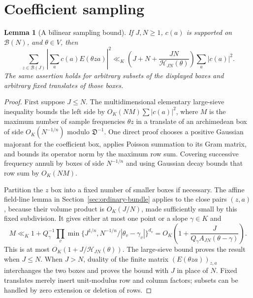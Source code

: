 \documentclass[11pt]{amsart}
\newtheorem{lemma}[theorem]{Lemma}
\theoremstyle{definition}
\numberwithin{equation}{section}
\begin{document}
\section{Coefficient sampling}
\label{sec:coefficient-sampling-common}
\begin{lemma}[A bilinear sampling bound]
\label{lem:g789-bilinear}
If $J,N\ge1$, $c(a)$ is supported on $\mathcal B(N)$, and
$\theta\in V$, then
\[
 \sum_{z\in\mathcal B(J)}
       \left|\sum_a c(a)E(\theta za)\right|^2
 \ll_K\left(J+N+\frac{JN}{\mathcal H_{JN}(\theta)}\right)
                         \sum_a|c(a)|^2.
\]
The same assertion holds for arbitrary subsets of the displayed
boxes and arbitrary fixed translates of those boxes.
\end{lemma}
\begin{proof}
First suppose $J\le N$. The multidimensional elementary large-sieve
inequality bounds the left side by $O_K(NM)\sum|c(a)|^2$, where $M$
is the maximum number of sample frequencies $\theta z$ in a translate
of an archimedean box of side $O_K(N^{-1/n})$ modulo
$\mathfrak D^{-1}$. One direct proof chooses a positive Gaussian
majorant for the coefficient box, applies Poisson summation to its
Gram matrix, and bounds its operator norm by the maximum row sum.
Covering successive frequency annuli by boxes of side $N^{-1/n}$
and using Gaussian decay bounds that row sum by $O_K(NM)$.

Partition the $z$ box into a fixed number of smaller boxes if
necessary. The affine field-line lemma in Section~\ref{sec:ordinary-bundle}
applies to the close pairs $(z,a)$, because their volume product is
$O_K(J/N)$, made sufficiently small by this fixed subdivision.
It gives either at most one point or a slope $\gamma\in K$ and
\[
 M\ll_K1+Q_\gamma^{-1}
       \prod_v\min\{J^{1/n},N^{-1/n}/|\theta_v-\gamma_v|\}^{d_v}
 =O_K\left(1+\frac{J}{Q_\gamma A_{JN}(\theta-\gamma)}\right).
\]
This is at most $O_K(1+J/\mathcal H_{JN}(\theta))$.
The large-sieve bound proves the result when $J\le N$.
When $J>N$, duality of the finite matrix
$(E(\theta za))_{z,a}$ interchanges the two boxes and proves the
bound with $J$ in place of $N$. Fixed translates merely insert
unit-modulus row and column factors; subsets can be handled by
zero extension or deletion of rows.
\end{proof}
\end{document}
